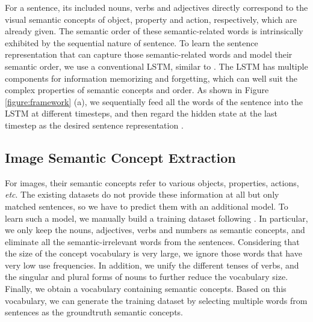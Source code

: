 \documentclass[10pt,twocolumn,letterpaper]{article}
\begin{document}
For a sentence, its included nouns, verbs and adjectives
directly correspond to the visual semantic concepts of object, property and action, respectively,
which are already given.
The semantic order of these semantic-related words
is intrinsically exhibited by the sequential nature of sentence.
To learn the sentence representation that
can capture those semantic-related words
and model their semantic order,
we use a conventional LSTM, similar to \cite{kiros2014unifying,vendrov2015order}.
The LSTM has multiple components for information memorizing and forgetting,
which can well suit the complex properties of semantic concepts and order.
As shown in Figure \ref{figure:framework} (a),
we sequentially feed all the words of the sentence into the LSTM at different timesteps,
and then regard the hidden state at the last timestep as
the desired sentence representation .






\subsection{Image Semantic Concept Extraction}

For images, their semantic concepts refer to various objects,
properties, actions, \emph{etc}.
The existing datasets do not provide these information at all
but only matched sentences,
so we have to predict them with an additional model.
To learn such a model, we manually build a training dataset
following \cite{fang2015captions,wu2016value}.
In particular, we only keep the nouns, adjectives, verbs and numbers as semantic concepts,
and eliminate all the semantic-irrelevant words from the sentences.
Considering that the size of the concept vocabulary is very large,
we ignore those words that have very low use frequencies.
In addition, we unify the different tenses of verbs,
and the singular and plural forms of nouns
to further reduce the vocabulary size.
Finally, we obtain a vocabulary containing  semantic concepts.
Based on this vocabulary, we can generate the training dataset
by selecting multiple words from sentences as the groundtruth semantic concepts.
\end{document}
